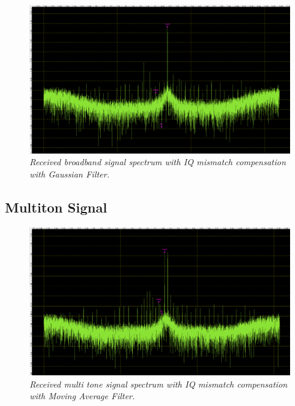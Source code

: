 \documentclass[en,printmode]{mgr}
\begin{document}
   		\begin{figure}[!htb]
    		\centering
   			\includegraphics[width=\textwidth]{plots/my_single_gauss.png}
   		 	\caption{\textit{Received broadband signal spectrum with IQ mismatch compensation with
   		 	Gaussian Filter.}}
   		\end{figure}	
   		
   		\subsection*{Multiton Signal}
  		\begin{figure}[!htb]
    		\centering
   			\includegraphics[width=\textwidth]{plots/my_multi_mav.png}
   		 	\caption{\textit{Received multi tone signal spectrum with IQ mismatch compensation with
   		 	Moving Average Filter.}}
   		\end{figure}	
   		
\end{document}
